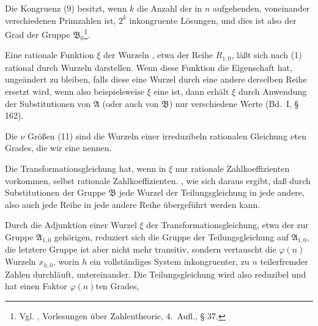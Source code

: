 
Die Kongruenz (9) besitzt, wenn $k$ die Anzahl der in $n$ aufgehenden, voneinander
verschiedenen Primzahlen ist, $2^k$ inkongruente Lösungen, und dies ist also der Grad
der Gruppe $\mathfrak{B}_0$\footnote{Vgl. , Vorlesungen über Zahlentheorie, 4.\ Aufl., § 37.}.

Eine rationale Funktion $\xi$ der Wurzeln , etwa der Reihe $R_{1,0}$,
läßt sich nach (1) rational durch  Wurzeln darstellen. Wenn diese Funktion
die Eigenschaft hat, ungeändert zu bleiben, falls diese eine Wurzel durch eine andere
derselben Reihe ersetzt wird, wenn also beispielsweise $\xi$ eine  ist, dann erhält $\xi$ durch Anwendung der Substitutionen von
$\mathfrak{A}$ (oder auch von $\mathfrak{B}$) nur
verschiedene Werte
 (Bd.\ I, § 162).

Die $\nu$ Größen (11) sind die Wurzeln einer irreduzibeln rationalen Gleichung $\nu$ten
Grades, die wir eine  nennen.

Die Transformationsgleichung hat, wenn in $\xi$ nur rationale Zahlkoeffizienten
vorkommen, selbst rationale Zahlkoeffizienten. , wie
sich daraus ergibt, daß durch Substitutionen der Gruppe $\mathfrak{B}$ jede Wurzel der
Teilungsgleichung in jede andere, also auch jede Reihe in jede andere Reihe übergeführt
werden kann.

Durch die Adjunktion einer Wurzel $\xi$ der Transformationsgleichung, etwa der zur
Gruppe $\mathfrak{A}_{1,0}$ gehörigen, reduziert sich die Gruppe der Teilungsgleichung
auf $\mathfrak{A}_{1,0}$, die letztere Gruppe ist aber nicht mehr transitiv, sondern
vertauscht die $\varphi(n)$ Wurzeln $x_{h,0}$, worin $h$ ein vollständiges System
inkongruenter, zu $n$ teilerfremder Zahlen durchläuft, untereinander. Die
Teilungsgleichung wird also reduzibel und hat einen Faktor $\varphi(n)$ten Grades,

